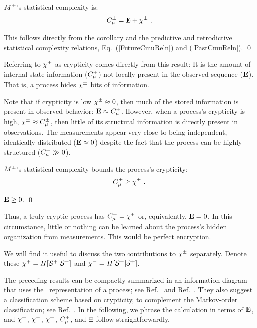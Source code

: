 \begin{The}
${M}^{\pm}$'s statistical complexity is:
\begin{equation}
C_\mu^{\pm} = {\bf E} + \chi^{\pm} ~.
\end{equation}
\end{The}

\begin{ProThe}
This follows directly from the corollary and the predictive and retrodictive
statistical complexity relations, Eq.~(\ref{FutureCmuReln}) and (\ref{PastCmuReln}).
\qed
\end{ProThe}

Referring to $\chi^{\pm}$ as crypticity comes directly from this result: It
is the amount of internal state information ($C_\mu^{\pm}$) not locally
present in the observed sequence (${\bf E}$). That is, a process hides
$\chi^{\pm}$ bits of information.

Note that if crypticity is low $\chi^{\pm} \approx 0$, then much of the stored
information is present in observed behavior: ${\bf E} \approx C_\mu^{\pm}$. However,
when a process's crypticity is high, $\chi^{\pm} \approx C_\mu^{\pm}$, then little of its
structural information is directly present in observations. The measurements
appear very close to being independent, identically distributed
(${\bf E} \approx 0$) despite the fact that the process can be highly structured
($C_\mu^{\pm} \gg 0$).

\begin{Cor}
${M}^{\pm}$'s statistical complexity bounds the process's crypticity:
\begin{equation}
C_\mu^{\pm} \geq \chi^{\pm} ~.
\end{equation}
\end{Cor}

\begin{ProCor}
${\bf E} \geq 0$.
\qed
\end{ProCor}

Thus, a truly cryptic process has $C_\mu^{\pm} = \chi^{\pm}$ or, equivalently, ${\bf E} = 0$.
In this circumstance, little or nothing can be learned about the process's
hidden organization from measurements. This would be perfect encryption.

We will find it useful to discuss the two contributions to $\chi^{\pm}$ separately.
Denote these \mbox{$\chi^{+} = H[{\mathcal{S}}^{+}|{\mathcal{S}}^{-}]$} and
\mbox{$\chi^{-} = H[{\mathcal{S}}^{-}|{\mathcal{S}}^{+}]$}.

The preceding results can be compactly summarized in an information diagram
that uses the \eM\ representation of a process; see Ref.~\cite{Crut08a} and
Ref.~\cite{Crut08c}. They also suggest a classification scheme based on crypticity,
to complement the Markov-order classification; see Ref.~\cite{Crut08d}. In the 
following, we phrase the calculation
in terms of ${\bf E}$, and $\chi^{+}$, $\chi^{-}$, $\chi^{\pm}$, $C_\mu^{\pm}$, and $\Xi$ 
follow straightforwardly.

